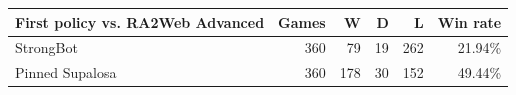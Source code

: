 
\begin{tabular}{@{}lrrrrr@{}}
\toprule
First policy vs. RA2Web Advanced & Games & W & D & L & Win rate \\
\midrule
StrongBot & 360 & 79 & 19 & 262 & 21.94\% \\
Pinned Supalosa & 360 & 178 & 30 & 152 & 49.44\% \\
\bottomrule
\end{tabular}
